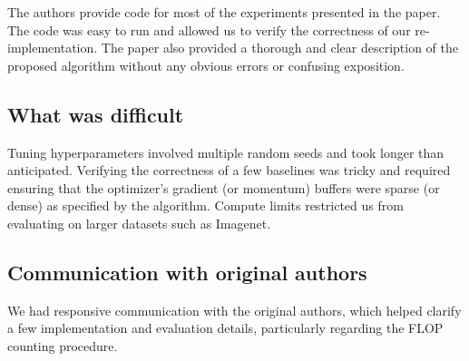
The authors provide code for most of the experiments presented in the paper. The code was easy to run and allowed us to verify the correctness of our re-implementation. The paper also provided a thorough and clear description of the proposed algorithm without any obvious errors or confusing exposition. 

\subsection*{What was difficult}


Tuning hyperparameters involved multiple random seeds and took longer than anticipated. Verifying the correctness of a few baselines was tricky and required ensuring that the optimizer's gradient (or momentum) buffers were sparse (or dense) as specified by the algorithm. Compute limits restricted us from evaluating on larger datasets such as Imagenet.

\subsection*{Communication with original authors}


We had responsive communication with the original authors, which helped clarify a few implementation and evaluation details, particularly regarding the FLOP counting procedure.